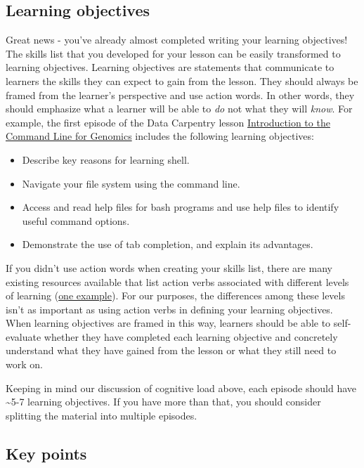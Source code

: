 \documentclass[
]{book}
\providecommand{\tightlist}{%
  \setlength{\itemsep}{0pt}\setlength{\parskip}{0pt}}
\begin{document}
\hypertarget{learning-objectives}{%
\subsection{Learning objectives}\label{learning-objectives}}

Great news - you've already almost completed writing your learning objectives! The skills list that you developed
for your lesson can be easily transformed to learning objectives. Learning objectives are statements that
communicate to learners the skills they can expect to gain from the lesson. They should always be framed
from the learner's perspective and use action words. In other words, they should emphasize what a learner
will be able to \emph{do} not what they will \emph{know}. For example, the first episode of the Data Carpentry lesson \href{https://datacarpentry.org/shell-genomics/}{Introduction to the Command Line for Genomics} includes the
following learning objectives:

\begin{itemize}
\tightlist
\item
  Describe key reasons for learning shell.
\item
  Navigate your file system using the command line.
\item
  Access and read help files for bash programs and use help files to identify useful command options.
\item
  Demonstrate the use of tab completion, and explain its advantages.
\end{itemize}

If you didn't use action words when creating your skills list, there are many existing resources available that
list action verbs associated with different levels of learning (\href{https://tips.uark.edu/blooms-taxonomy-verb-chart/}{one example}). For our purposes, the differences among these
levels isn't as important as using action verbs in defining your learning objectives. When learning objectives
are framed in this way, learners should be able to self-evaluate whether they have completed each learning
objective and concretely understand what they have gained from the lesson or what they still need to work on.

Keeping in mind our discussion of cognitive load above, each episode should have \textasciitilde5-7 learning objectives. If you
have more than that, you should consider splitting the material into multiple episodes.

\hypertarget{key-points}{%
\subsection{Key points}\label{key-points}}
\end{document}
